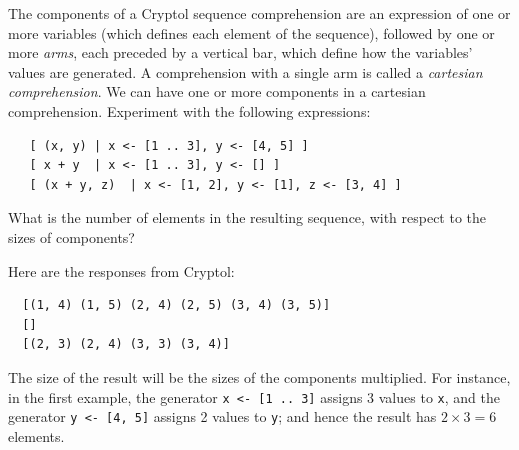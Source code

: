 \begin{Exercise}\label{ex:seq:4}
  The components of a Cryptol sequence comprehension are
  an expression of one or more variables (which defines each element of
  the sequence), followed by one or more {\em arms}, each preceded by
  a vertical bar, which define how the variables' values are generated.
  A comprehension with a single arm is called a {\em cartesian
  comprehension}. We can have one or more components in a cartesian
  comprehension.  Experiment with the following
  expressions:\indComp\indCartesian
\begin{Verbatim}
   [ (x, y) | x <- [1 .. 3], y <- [4, 5] ]
   [ x + y  | x <- [1 .. 3], y <- [] ]
   [ (x + y, z)  | x <- [1, 2], y <- [1], z <- [3, 4] ]
\end{Verbatim}
What is the number of elements in the resulting sequence, with respect
to the sizes of components?

\end{Exercise}
\begin{Answer}
Here are the responses from Cryptol:
\begin{Verbatim}
  [(1, 4) (1, 5) (2, 4) (2, 5) (3, 4) (3, 5)]
  []
  [(2, 3) (2, 4) (3, 3) (3, 4)]
\end{Verbatim}
The size of the result will be the sizes of the components
multiplied. For instance, in the first example, the generator {\tt x
  <- [1 .. 3]} assigns 3 values to {\tt x}, and the generator {\tt y
  <- [4, 5]} assigns 2 values to {\tt y}; and hence the result has
$2\times 3 = 6$ elements.
\end{Answer}

